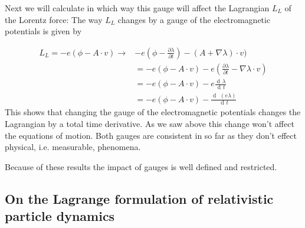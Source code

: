 \documentclass{article}
\DeclareMathOperator{\dd}{d\!}
\begin{document}
Next we will calculate in which way this gauge will affect the Lagrangian $L_L$ of the Lorentz force:
The way $L_L$ changes by a gauge of the electromagnetic potentials is given by

\begin{align}
    L_L = - e (\phi - A \cdot v) \rightarrow & -e(\phi-\frac{\partial \lambda}{\partial t}) - (A + \nabla \lambda) \cdot v) \nonumber \\
    & = - e (\phi - A \cdot v) - e (\frac{\partial \lambda}{\partial t} - \nabla \lambda \cdot v) \nonumber \\
    & = - e (\phi - A \cdot v) - e \frac{\dd \lambda}{\dd t} \nonumber \\
    & = - e (\phi - A \cdot v) - \frac{\dd \; (e \lambda)}{\dd t}
\end{align}
This shows that changing the gauge of the electromagnetic potentials changes the Lagrangian by a total time derivative.
As we saw above this change won't affect the equations of motion.
Both gauges are consistent in so far as they don't effect physical, i.e. measurable, phenomena.

Because of these results the impact of gauges is well defined and restricted.

\subsection{On the Lagrange formulation of relativistic particle dynamics} \label{sectionOnRelativisticParticles}
\end{document}
